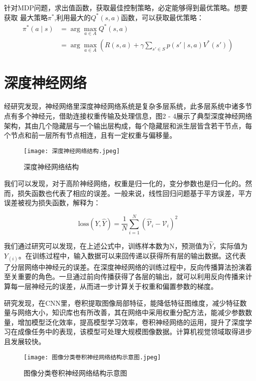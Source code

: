 针对MDP问题，求出值函数，获取最佳控制策略，必定能够得到最优策略。想要获取
最大策略$\pi^*$,利用最大的$Q^*(s,a)$函数，可以获取最优策略：
\begin{align}
	\pi^*(a \mid s) &= \arg\max_{a \in A} Q^*(s, a) \label{eq:policy1} \\
	&= \arg\max_{a \in A} \left( R(s, a) + \gamma \sum_{s' \in S} p(s' \mid s, a) V^*(s') \right) \label{eq:policy2}
\end{align}

\section{深度神经网络}

经研究发现，神经网络里深度神经网络系统是复杂多层系统，此多层系统中诸多节点有多个神经元，借助连接权重传输及处理信息，图2 - 4展示了典型深度神经网络架构，其由几个隐藏层与一个输出层构成，每个隐藏层和派生层皆含若干节点，每个节点和前一层所有节点相连，且有一定权重与偏移量。

\begin{figure}[hbt]
	\centering
	\texttt{[image: 深度神经网络结构.jpeg]}
	\caption{深度神经网络结构}
	\label{f.example}
\end{figure}

我们可以发现，对于高阶神经网络，权重是归一化的，变分参数也是归一化的。然而，损失函数也代表了相应的误差。一般来说，线性回归问题基于平方误差，平方误差被视为损失函数，解释为：

\begin{equation}
\text{loss}(Y, \hat{Y}) = \frac{1}{N} \sum_{i=1}^{N} \left( \hat{\mathcal{V}}_i - \mathcal{V}_i \right)^2
\end{equation}

我们通过研究可以发现，在上述公式中，训练样本数为N，预测值为$\hat{Y}$，实际值为$Y_(i)$。在训练过程中，输入数据可以来回传递以获得所有层的输出数据。这代表了分层网络中神经元的误差。在深度神经网络的训练过程中，反向传播算法扮演着至关重要的角色。一旦通过前向传播获得了各层的输出，就可以利用反向传播来计算每一层神经元的误差，从而进一步计算关于权重和偏置参数的梯度。


研究发现，在CNN里，卷积提取图像局部特征，能降低特征图维度，减少特征数量与网络大小，知识库也有所改善，其在网络中采用权重分配方法，能减少参数数量，增加模型泛化效率，提高模型学习效率，卷积神经网络的运用，提升了深度学习在成像任务中的表现，该模型可处理大规模图像数据。计算机视觉领域取得进步且发展较快。
\begin{figure}[hbt]
	\centering
	\texttt{[image: 图像分类卷积神经网络结构示意图.jpeg]}
	\caption{图像分类卷积神经网络结构示意图}
	\label{f.example}
\end{figure}

